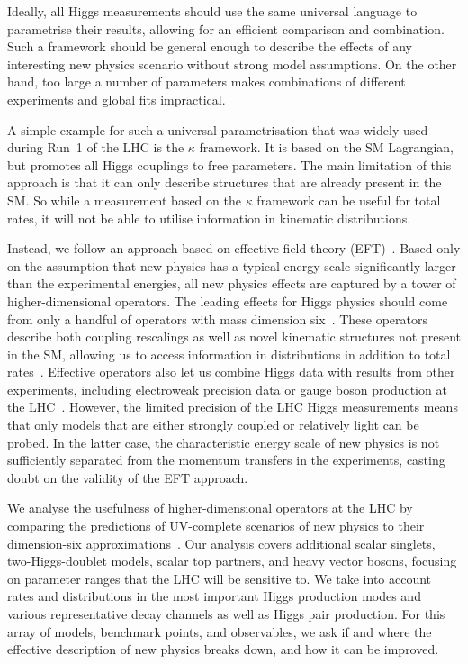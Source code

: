 \newparagraph
%
Ideally, all Higgs measurements should use the same universal language
to parametrise their results, allowing for an efficient comparison
and combination. Such a framework should be general enough to describe
the effects of any interesting new physics scenario without strong model
assumptions. On the other hand, too large a number of parameters makes
combinations of different experiments and global fits impractical.

A simple example for such a universal parametrisation that was widely
used during Run~1 of the LHC is the $\kappa$ framework. It is based on
the SM Lagrangian, but promotes all Higgs couplings to free
parameters. The main limitation of this approach is that it can only
describe structures that are already present in the SM. So while a
measurement based on the $\kappa$ framework can be useful for total
rates, it will not be able to utilise information in kinematic
distributions.

Instead, we follow an approach based on effective field theory
(EFT)~\cite{Coleman:1969sm, Callan:1969sn, Weinberg:1980wa}. Based
only on the assumption that new physics has a typical energy scale
significantly larger than the experimental energies, all new physics
effects are captured by a tower of higher-dimensional operators. The
leading effects for Higgs physics should come from only a handful of
operators with mass dimension six~\cite{Burges:1983zg, Leung:1984ni,
  Buchmuller:1985jz}. These operators
%
%
describe both coupling rescalings as well as novel kinematic
structures not present in the SM, allowing us to access information in
distributions in addition to total rates~\cite{Corbett:2012ja,
  Corbett:2015ksa}. Effective operators also let us combine Higgs data
with results from other experiments, including electroweak precision
data or gauge boson production at the
LHC~\cite{Butter:2016cvz}. However, the limited precision of the LHC
Higgs measurements means that only models that are either strongly
coupled or relatively light can be probed. In the latter case, the
characteristic energy scale of new physics is not sufficiently
separated from the momentum transfers in the experiments, casting
doubt on the validity of the EFT approach.

We analyse the usefulness of higher-dimensional operators at the LHC
by comparing the predictions of UV-complete scenarios of new physics
to their dimension-six approximations~\cite{Brehmer:2015rna}. Our
analysis covers additional scalar singlets, two-Higgs-doublet models,
scalar top partners, and heavy vector bosons, focusing on parameter
ranges that the LHC will be sensitive to. We take into account rates
and distributions in the most important Higgs production modes and
various representative decay channels as well as Higgs pair
production. For this array of models, benchmark points, and
observables, we ask if and where the effective description of new
physics breaks down, and how it can be improved.

